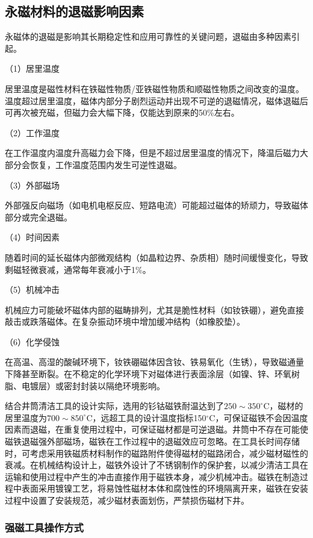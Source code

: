 \subsection{永磁材料的退磁影响因素}

永磁体的退磁是影响其长期稳定性和应用可靠性的关键问题，退磁由多种因素引起。

（1）居里温度

居里温度是磁性材料在铁磁性物质/亚铁磁性物质和顺磁性物质之间改变的温度。温度超过居里温度，磁体内部分子剧烈运动并出现不可逆的退磁情况，磁体退磁后可再次被充磁，但磁力会大幅下降，仅能达到原来的50\%左右。

（2）工作温度

在工作温度内温度升高磁力会下降，但是不超过居里温度的情况下，降温后磁力大部分会恢复，工作温度范围内发生可逆性退磁。

（3）外部磁场

外部强反向磁场（如电机电枢反应、短路电流）可能超过磁体的矫顽力，导致磁体部分或完全退磁。

（4）时间因素

随着时间的延长磁体内部微观结构（如晶粒边界、杂质相）随时间缓慢变化，导致剩磁轻微衰减，通常每年衰减小于1\%。

（5）机械冲击

机械应力可能破坏磁体内部的磁畴排列，尤其是脆性材料（如钕铁硼），避免直接敲击或跌落磁体。在复杂振动环境中增加缓冲结构（如橡胶垫）。

（6）化学侵蚀

在高温、高湿的酸碱环境下，钕铁硼磁体因含钕、铁易氧化（生锈），导致磁通量下降甚至断裂。在不稳定的化学环境下对磁体进行表面涂层（如镍、锌、环氧树脂、电镀层）或密封封装以隔绝环境影响。

结合井筒清洁工具的设计实际，选用的钐钴磁铁耐温达到了$250\sim 350^\circ$C，磁材的居里温度为$700\sim 850^\circ$C，远超工具的设计温度指标150$^\circ$C，可保证磁铁不会因温度因素而退磁，在重复使用过程中，可保证磁材都是可逆退磁。井筒中不存在可能使磁铁退磁强外部磁场，磁铁在工作过程中的退磁效应可忽略。在工具长时间存储时，可考虑采用铁磁质材料制作的磁路附件使得磁材的磁路闭合，减少磁材磁性的衰减。在机械结构设计上，磁铁外设计了不锈钢制作的保护套，以减少清洁工具在运输和使用过程中产生的冲击直接作用于磁铁本身，减少机械冲击。磁铁在制造过程中表面采用镀镍工艺，将易蚀性磁材本体和腐蚀性的环境隔离开来，磁铁在安装过程中设置了安装规范，减少磁材表面划伤，严禁损伤磁材下井。

\subsubsection{强磁工具操作方式}

